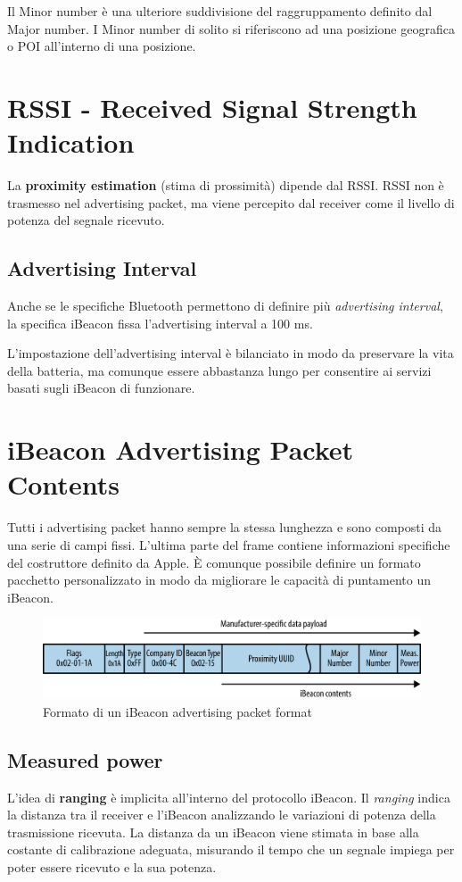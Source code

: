 Il Minor number è una ulteriore suddivisione del raggruppamento definito dal Major number. I Minor number di solito si riferiscono ad una posizione geografica o POI all'interno di una posizione.

\section{RSSI - Received Signal Strength Indication}
La \textbf{proximity estimation} (stima di prossimità) dipende dal RSSI. RSSI non è trasmesso nel advertising packet, ma viene percepito dal receiver come il livello di potenza del segnale ricevuto.

\subsection{Advertising Interval}
Anche se le specifiche Bluetooth permettono di definire più \textit{advertising interval}, la specifica iBeacon fissa l'advertising interval a 100 ms.

L'impostazione dell'advertising interval è bilanciato in modo da preservare la vita della batteria, ma comunque essere abbastanza lungo per consentire ai servizi basati sugli iBeacon di funzionare.

\section{iBeacon Advertising Packet Contents}
Tutti i advertising packet hanno sempre la stessa lunghezza e sono composti da una serie di campi fissi. L'ultima parte del frame contiene informazioni specifiche del costruttore definito da Apple. È comunque possibile definire un formato pacchetto personalizzato in modo da migliorare le capacità di puntamento un iBeacon.

\begin{figure}[!ht]
	\centering
	\includegraphics[scale=.25]{img/bt/iBeacon_advertising_packet_format.png}
	\caption{Formato di un iBeacon advertising packet format}
\end{figure}

\newpage
\subsection{Measured power}
L'idea di \textbf{ranging} è implicita all'interno del protocollo iBeacon. Il \textit{ranging} indica la distanza tra il receiver e l'iBeacon analizzando le variazioni di potenza della trasmissione ricevuta. La distanza da un iBeacon viene stimata in base alla costante di calibrazione adeguata, misurando il tempo che un segnale impiega per poter essere ricevuto e la sua potenza.

